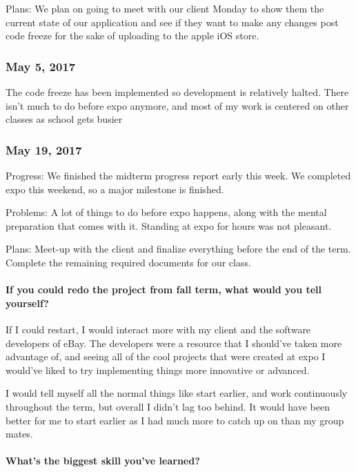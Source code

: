 Plans: We plan on going to meet with our client Monday to show them the
current state of our application and see if they want to make any
changes post code freeze for the sake of uploading to the apple iOS
store.

\subsubsection{May 5, 2017}\label{section}
The code freeze has been implemented so development is relatively halted. There isn't much to do before expo anymore, and most of my work is centered on other classes as school gets busier

\subsubsection{May 19, 2017}\label{section}
Progress: We finished the midterm progress report early this week. We
completed expo this weekend, so a major milestone is finished.

Problems: A lot of things to do before expo happens, along with the
mental preparation that comes with it. Standing at expo for hours was
not pleasant.

Plans: Meet-up with the client and finalize everything before the end of
the term. Complete the remaining required documents for our class.

\paragraph{If you could redo the project from fall term, what would you
tell
yourself?}\label{if-you-could-redo-the-project-from-fall-term-what-would-you-tell-yourself}

If I could restart, I would interact more with my client and the
software developers of eBay. The developers were a resource that I
should've taken more advantage of, and seeing all of the cool projects
that were created at expo I would've liked to try implementing things
more innovative or advanced.

I would tell myself all the normal things like start earlier, and work
continuously throughout the term, but overall I didn't lag too behind.
It would have been better for me to start earlier as I had much more to
catch up on than my group mates.

\paragraph{What's the biggest skill you've
learned?}\label{whats-the-biggest-skill-youve-learned}

